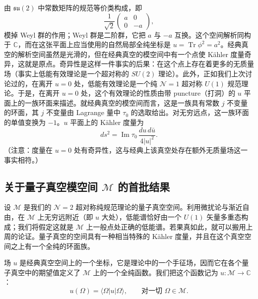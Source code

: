 由 $\mathfrak{su}(2)$ 中常数矩阵的规范等价类构成，即
\[
\frac{1}{\sqrt2}\begin{pmatrix}a&0\\0&-a\end{pmatrix},
\]
模掉 Weyl 群的作用；Weyl 群是二阶群，它把 $a$ 与 $-a$ 互换。这个空间解析同构于 $\mathbb{C}$，而在这张平面上应当使用的自然局部全纯坐标是 $u=\operatorname{Tr}\phi^2=a^2$。经典真空的解析空间虽然是光滑的，但在经典真空的模空间中有一个点使 Kähler 度量奇异，这就是原点。奇异性是这样一件事实的后果：在这个点上存在着更多的无质量场（事实上低能有效理论是一个超对称的 $SU(2)$ 理论）。此外，正如我们上次讨论过的，在离开 $u=0$ 处，低能有效理论是一个纯 $\mathcal{N}=1$ 超对称 $U(1)$ 规范理论。于是，在离开 $u=0$ 处，这个有效理论的性质由带 puncture（打洞）的 $u$ 平面上的一族环面来描述。就经典真空的模空间而言，这是一族具有常数 $j$ 不变量的环面，其 $j$ 不变量由 Lagrange 量中 $\tau_0$ 的选取给出。对无穷远点，这一族环面的单值变换为 $-1$。$u$ 平面上的 Kähler 度量为
\[
ds^2=\operatorname{Im}\tau_0\,\frac{du\,d\bar u}{4|u|^2}.
\]
（注意：度量在 $u=0$ 处有奇异性，这与经典上该真空处存在额外无质量场这一事实相符。）


\subsection{关于量子真空模空间 $\mathcal{M}$ 的首批结果}

设 $\mathcal{M}$ 是我们的 $\mathcal{N}=2$ 超对称纯规范理论的量子真空空间。利用微扰论与渐近自由，在 $\mathcal{M}$ 上无穷远附近（即 $u$ 大处），低能谱恰好由一个 $U(1)$ 矢量多重态构成；我们将假定这就是 $\mathcal{M}$ 上一般点处正确的低能谱。若果真如此，就可以搬用上周的论证。量子真空的空间具有一种相当特殊的 Kähler 度量，并且在这个真空空间之上有一个全纯的环面族。

场 $u$ 是经典真空空间上的一个坐标，它是理论中的一个手征场，因而它在各个量子真空中的期望值定义了 $\mathcal{M}$ 上的一个全纯函数。我们把这个函数记为 $u:\mathcal{M}\to\mathbb{C}$：
\[
u(\Omega)=\langle\Omega|u|\Omega\rangle,\qquad\text{对一切 }\Omega\in\mathcal{M}.
\]

